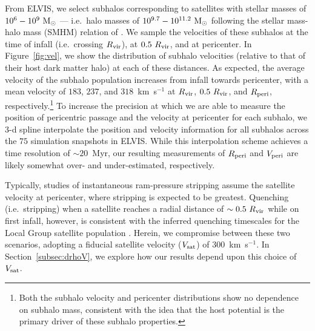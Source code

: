 \documentclass[usenatbib]{mn2e}
\newcommand{\msun}{{\rm M}_{\odot}}
\begin{document}
From ELVIS, we select subhalos corresponding to satellites with
stellar masses of $10^{6}-10^{9}~\msun$ --- i.e.~halo masses of
$10^{9.7}-10^{11.2}~\msun$ following the stellar mass-halo mass (SMHM)
relation of \citet{gk14}. 
%
We sample the velocities of these subhalos at the time of infall
(i.e.~crossing $R_{\rm vir}$), at $0.5~R_{\rm vir}$, and at
pericenter. In Figure~\ref{fig:vel}, we show the distribution of
subhalo velocities (relative to that of their host dark matter halo)
at each of these distances. 
%
As expected, the average velocity of the subhalo population increases
from infall towards pericenter, with a mean velocity of $183$, $237$,
and $318$~km~s$^{-1}$ at $R_{\rm vir}$, $0.5~R_{\rm vir}$, and $R_{\rm
  peri}$, respectively.\footnote{Both the subhalo velocity and
  pericenter distributions show no dependence on subhalo mass,
  consistent with the idea that the host potential is the primary
  driver of these subhalo properties.}
%
To increase the precision at which we are able to measure the position
of pericentric passage and the velocity at pericenter for each subhalo,
we 3-d spline interpolate the position and velocity information for
all subhalos across the $75$ simulation snapshots in ELVIS.
%
While this interpolation scheme achieves a time resolution of
$\sim20$~Myr, our resulting measurements of $R_{\rm peri}$ and $V_{\rm
  peri}$ are likely somewhat over- and under-estimated, respectively.
%


Typically, studies of instantaneous ram-pressure stripping assume the
satellite velocity at pericenter, where stripping is expected to be
greatest.
%
Quenching (i.e.~stripping) when a satellite reaches a radial distance
of $\sim0.5~R_{\rm vir}$ while on first infall, however, is consistent
with the inferred quenching timescales for the Local Group satellite
population \citep{fham15}. 
Herein, we compromise between these two scenarios, adopting a fiducial
satellite velocity ($V_{\rm sat}$) of $300$~km~s$^{-1}$. In
Section~\ref{subsec:drhoV}, we explore how our results depend upon
this choice of $V_{\rm sat}$.
\end{document}

